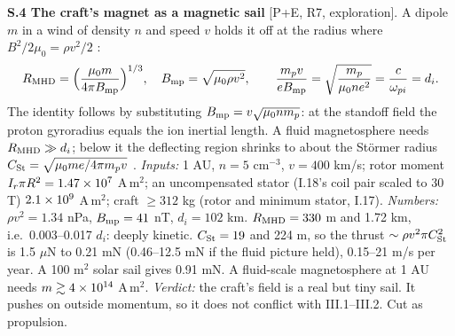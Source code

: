 \smallskip\noindent\textbf{S.4 The craft's magnet as a magnetic sail} [P+E, R7, exploration]. A dipole $m$ in a wind of density $n$ and speed $v$
holds it off at the radius where $B^2/2\mu_0=\rho v^2/2$ \cite{magsailrev}:
\begin{equation}
R_{\rm MHD}=\Big(\frac{\mu_0m}{4\pi B_{\rm mp}}\Big)^{1/3},\quad B_{\rm mp}=\sqrt{\mu_0\rho v^2},\qquad
\frac{m_pv}{eB_{\rm mp}}=\sqrt{\frac{m_p}{\mu_0ne^2}}=\frac{c}{\omega_{pi}}=d_i .\label{eq:magsail}
\end{equation}
The identity follows by substituting $B_{\rm mp}=v\sqrt{\mu_0nm_p}$: at the standoff field the proton gyroradius equals the ion inertial
length. A fluid magnetosphere needs $R_{\rm MHD}\gg d_i$; below it the deflecting region shrinks to about the St\"ormer radius
$C_{\rm St}=\sqrt{\mu_0me/4\pi m_pv}$ \cite{shaikh11,khazanov04}.
\emph{Inputs:} 1 AU, $n=5$ cm$^{-3}$, $v=400$ km/s; rotor moment $I_r\pi R^2=1.47\times10^{7}$ A\,m$^2$; an uncompensated stator (I.18's coil pair scaled to
30 T) $2.1\times10^{9}$ A\,m$^2$; craft $\ge312$ kg (rotor and minimum stator, I.17).
\emph{Numbers:} $\rho v^2=1.34$ nPa, $B_{\rm mp}=41$ nT, $d_i=102$ km. $R_{\rm MHD}=330$ m and 1.72 km, i.e.\ 0.003--0.017 $d_i$: deeply kinetic.
$C_{\rm St}=19$ and 224 m, so the thrust $\sim\rho v^2\pi C_{\rm St}^2$ is 1.5 $\mu$N to 0.21 mN (0.46--12.5 mN if the fluid picture held), 0.15--21 m/s
per year. A 100 m$^2$ solar sail gives 0.91 mN. A fluid-scale magnetosphere at 1 AU needs $m\gtrsim4\times10^{14}$ A\,m$^2$.
\emph{Verdict:} the craft's field is a real but tiny sail. It pushes on outside momentum, so it does not conflict with III.1--III.2. Cut as
propulsion.
